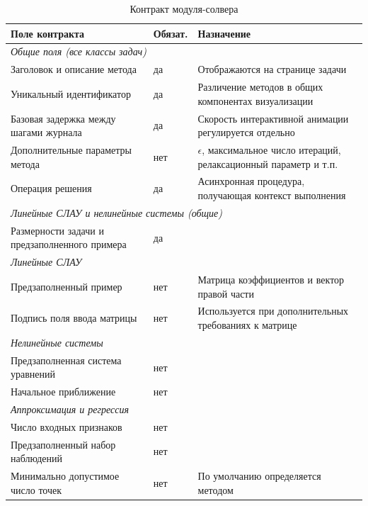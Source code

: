 \documentclass[12pt, oneside]{book}
\begin{document}
\begin{table}[htbp]
\centering
\scriptsize
\renewcommand{\arraystretch}{1.15}
\begin{tabular}{|p{4.2cm}|p{1.8cm}|p{6.6cm}|}
\hline
\rowcolor{thbg} \textbf{Поле контракта} & \textbf{Обязат.} & \textbf{Назначение} \\
\hline
\multicolumn{3}{|l|}{\textit{Общие поля (все классы задач)}} \\
\hline
Заголовок и описание метода & да & Отображаются на странице задачи \\
\hline
Уникальный идентификатор & да & Различение методов в общих компонентах визуализации \\
\hline
Базовая задержка между шагами журнала & да & Скорость интерактивной анимации регулируется отдельно \\
\hline
Дополнительные параметры метода & нет & $\epsilon$, максимальное число итераций, релаксационный параметр и т.п. \\
\hline
Операция решения & да & Асинхронная процедура, получающая контекст выполнения \\
\hline
\multicolumn{3}{|l|}{\textit{Линейные СЛАУ и нелинейные системы (общие)}} \\
\hline
Размерности задачи и предзаполненного примера & да & \\
\hline
\multicolumn{3}{|l|}{\textit{Линейные СЛАУ}} \\
\hline
Предзаполненный пример & нет & Матрица коэффициентов и вектор правой части \\
\hline
Подпись поля ввода матрицы & нет & Используется при дополнительных требованиях к матрице \\
\hline
\multicolumn{3}{|l|}{\textit{Нелинейные системы}} \\
\hline
Предзаполненная система уравнений & нет & \\
\hline
Начальное приближение & нет & \\
\hline
\multicolumn{3}{|l|}{\textit{Аппроксимация и регрессия}} \\
\hline
Число входных признаков & нет & \\
\hline
Предзаполненный набор наблюдений & нет & \\
\hline
Минимально допустимое число точек & нет & По умолчанию определяется методом \\
\hline
\end{tabular}
\caption{Контракт модуля-солвера}
\label{tab:solver_contract}
\end{table}
\end{document}
